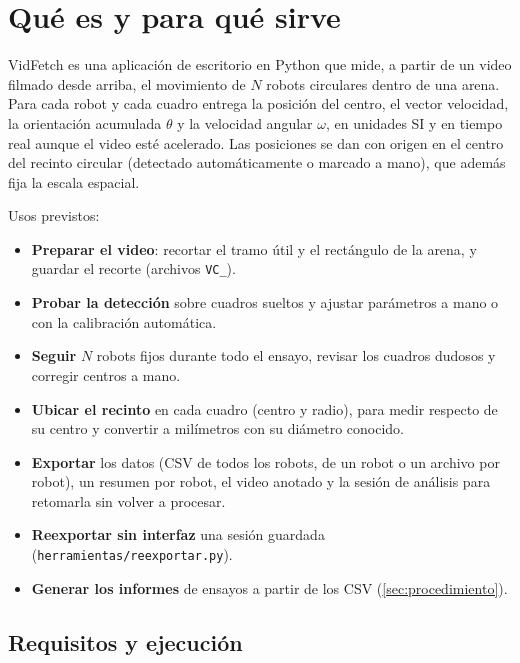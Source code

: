 \section{Qué es y para qué sirve}\label{sec:app}

VidFetch es una aplicación de escritorio en Python que mide, a partir de un video filmado desde
arriba, el movimiento de $N$ robots circulares dentro de una arena. Para cada robot y cada cuadro
entrega la posición del centro, el vector velocidad, la orientación acumulada $\theta$ y la
velocidad angular $\omega$, en unidades SI y en tiempo real aunque el video esté acelerado. Las
posiciones se dan con origen en el centro del recinto circular (detectado automáticamente o marcado a
mano), que además fija la escala espacial.

Usos previstos:
\begin{itemize}
  \item \textbf{Preparar el video}: recortar el tramo útil y el rectángulo de la arena, y guardar el
        recorte (archivos \texttt{VC\_}).
  \item \textbf{Probar la detección} sobre cuadros sueltos y ajustar parámetros a mano o con la
        calibración automática.
  \item \textbf{Seguir} $N$ robots fijos durante todo el ensayo, revisar los cuadros dudosos y
        corregir centros a mano.
  \item \textbf{Ubicar el recinto} en cada cuadro (centro y radio), para medir respecto de su centro y
        convertir a milímetros con su diámetro conocido.
  \item \textbf{Exportar} los datos (CSV de todos los robots, de un robot o un archivo por robot), un
        resumen por robot, el video anotado y la sesión de análisis para retomarla sin volver a procesar.
  \item \textbf{Reexportar sin interfaz} una sesión guardada (\texttt{herramientas/reexportar.py}).
  \item \textbf{Generar los informes} de ensayos a partir de los CSV (\cref{sec:procedimiento}).
\end{itemize}

\subsection{Requisitos y ejecución}

